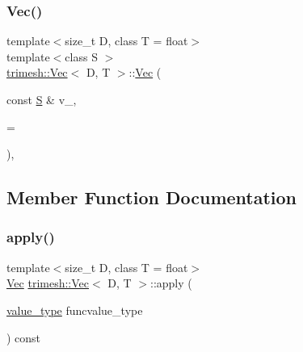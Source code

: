 \mbox{\label{classtrimesh_1_1Vec_aafe326a296b7086232d9484456684bc3}} 
\subsubsection{\texorpdfstring{Vec()}{Vec()}\hspace{0.1cm}{\footnotesize\ttfamily [7/7]}}
{\footnotesize\ttfamily template$<$size\+\_\+t D, class T = float$>$ \\
template$<$class S $>$ \\
\hyperlink{classtrimesh_1_1Vec}{trimesh\+::\+Vec}$<$ D, T $>$\+::\hyperlink{classtrimesh_1_1Vec}{Vec} (\begin{DoxyParamCaption}\item[{const \hyperlink{ego_8cc_abde73cd36321648268fb4543509b996a}{S} \&}]{v\+\_\+,  }\item[{typename \+::\hyperlink{structstd_1_1enable__if}{std\+::enable\+\_\+if}$<$ !\+::\hyperlink{structstd_1_1is__arithmetic}{std\+::is\+\_\+arithmetic}$<$ \hyperlink{ego_8cc_abde73cd36321648268fb4543509b996a}{S} $>$\+::\hyperlink{namespacetrimesh_ab10cc1052c9d1d1376d92211b6ca27dd}{value}, \hyperlink{namespacetrimesh_a784ddfd979e1c579bda795a8edfc3f43}{void} $>$\+::\hyperlink{namespacetrimesh_aa726c5bf9cff74a26269e8d258ae9e3d}{type} $\ast$}]{ = {} }\end{DoxyParamCaption})\hspace{0.3cm}{\ttfamily [inline]}, {\ttfamily [explicit]}}



\subsection{Member Function Documentation}
\mbox{\label{classtrimesh_1_1Vec_a8081c22fb39174eb46b3cd2d012f1b39}} 
\subsubsection{\texorpdfstring{apply()}{apply()}\hspace{0.1cm}{\footnotesize\ttfamily [1/2]}}
{\footnotesize\ttfamily template$<$size\+\_\+t D, class T = float$>$ \\
\hyperlink{classtrimesh_1_1Vec}{Vec} \hyperlink{classtrimesh_1_1Vec}{trimesh\+::\+Vec}$<$ D, T $>$\+::apply (\begin{DoxyParamCaption}\item[{\hyperlink{classtrimesh_1_1Vec_a10a59253996e42d67c713f37592669df}{value\+\_\+type} }]{funcvalue\+\_\+type }\end{DoxyParamCaption}) const\hspace{0.3cm}{\ttfamily [inline]}}

